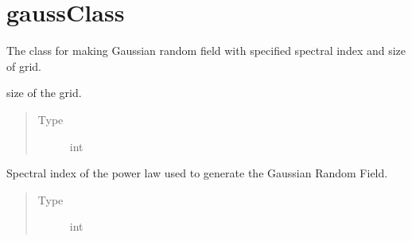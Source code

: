 \documentclass[letterpaper,10pt,english]{sphinxmanual}
\begin{document}
\chapter{gaussClass}
\label{\detokenize{gaussClass:gaussclass}}\label{\detokenize{gaussClass:id1}}\label{\detokenize{gaussClass::doc}}\label{\detokenize{gaussClass:module-gaussClass}}

\begin{fulllineitems}
\label{\detokenize{gaussClass:gaussClass.GaussianRandomField}}
\sphinxAtStartPar
The class for making Gaussian random field with specified spectral index and size of grid.

\begin{fulllineitems}
\label{\detokenize{gaussClass:gaussClass.GaussianRandomField.Nzise}}
\sphinxAtStartPar
size of the grid.
\begin{quote}\begin{description}
\item[{Type}] \leavevmode
\sphinxAtStartPar
int

\end{description}\end{quote}

\end{fulllineitems}


\begin{fulllineitems}
\label{\detokenize{gaussClass:gaussClass.GaussianRandomField.n}}
\sphinxAtStartPar
Spectral index of the power law used to generate the Gaussian Random Field.
\begin{quote}\begin{description}
\item[{Type}] \leavevmode
\sphinxAtStartPar
int


\end{description}
\end{quote}
\end{fulllineitems}
\end{fulllineitems}
\end{document}
